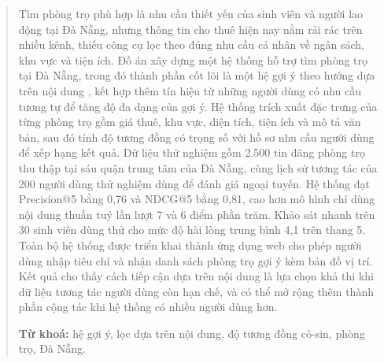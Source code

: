 \begin{abstract}

Tìm phòng trọ phù hợp là nhu cầu thiết yếu của sinh viên và người lao động
tại Đà Nẵng, nhưng thông tin cho thuê hiện nay nằm rải rác trên nhiều kênh,
thiếu công cụ lọc theo đúng nhu cầu cá nhân về ngân sách, khu vực và tiện
ích. Đồ án xây dựng một hệ thống hỗ trợ tìm phòng trọ tại Đà Nẵng, trong đó
thành phần cốt lõi là một hệ gợi ý theo hướng dựa trên nội dung
, kết hợp thêm tín hiệu từ những người dùng có
nhu cầu tương tự để tăng độ đa dạng của gợi ý. Hệ thống trích xuất đặc trưng
của từng phòng trọ gồm giá thuê, khu vực, diện tích, tiện ích và mô tả văn
bản, sau đó tính độ tương đồng có trọng số với hồ sơ nhu cầu người dùng để
xếp hạng kết quả. Dữ liệu thử nghiệm gồm 2.500 tin đăng phòng trọ thu thập
tại sáu quận trung tâm của Đà Nẵng, cùng lịch sử tương tác của 200 người
dùng thử nghiệm dùng để đánh giá ngoại tuyến. Hệ thống đạt Precision@5 bằng
0,76 và NDCG@5 bằng 0,81, cao hơn mô hình chỉ dùng nội dung thuần tuý lần
lượt 7 và 6 điểm phần trăm. Khảo sát nhanh trên 30 sinh viên dùng thử cho
mức độ hài lòng trung bình 4,1 trên thang 5. Toàn bộ hệ thống được triển
khai thành ứng dụng web cho phép người dùng nhập tiêu chí và nhận danh sách
phòng trọ gợi ý kèm bản đồ vị trí. Kết quả cho thấy cách tiếp cận dựa trên
nội dung là lựa chọn khả thi khi dữ liệu tương tác người dùng còn hạn chế,
và có thể mở rộng thêm thành phần cộng tác khi hệ thống có nhiều người dùng
hơn.

\vspace{0.8em}
\noindent\textbf{Từ khoá:} hệ gợi ý, lọc dựa trên nội dung, độ tương đồng
cô-sin, phòng trọ, Đà Nẵng.

\end{abstract}
